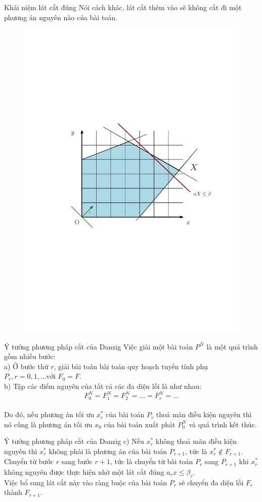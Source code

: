 \documentclass[10pt]{beamer}
\begin{document}
    \begin{frame}{Khái niệm lát cắt đúng}
         Nói cách khác, lát cắt thêm vào sẽ không cắt đi một phương án nguyên nào của bài toán.\\
    \bigskip
    \begin{figure}[h]
        \centering
        \includegraphics[width=0.6\linewidth]{anh2.pdf}
       
    \end{figure}
    \end{frame}

    \begin{frame}{ Ý tưởng phương pháp cắt của Danzig}
         Việc giải một bài toán $P^N$ là một quá trình gồm nhiều bước:\\
a) Ở bước thứ $r$,  giải bài toán bài toán quy hoạch tuyến tính phụ 
 $P_r, r = 0,1,\ldots \text{với }   F_0=F.$\\
b) Tập các điểm  nguyên của tất cả các đa diện lồi là như nhau:
$$F_0^N=F_1^N=F_2^N=\ldots=F_r^N=\ldots$$\\
Do đó, nếu phương án tối ưu $x^*_r$ của bài toán $P_r$ thoả mãn điều kiện nguyên thì nó cũng là phương án tối ưu $x_0$ của bài toán xuất phát $P^N_0$ và quá trình kết thúc.\\
\end{frame}

    \begin{frame}{ Ý tưởng phương pháp cắt của Danzig}
c)  Nếu $x^*_r$ không thoả mãn điều kiện nguyên thì $x^*_r$ không phải là 
phương án của bài toán $P_{r+1}$, tức là $x_r^*\notin F_{r+1}$.\\Chuyển từ bước $r$ sang bước $r+1$, tức là chuyển từ bài toán $P_r$ sang 
 $P_{r+1}$ khi $x^*_r$ không nguyên được thực hiện nhờ một lát cắt đúng $a_rx \le \beta_r$.\\
Việc bổ sung lát cắt này vào ràng buộc của bài toán $P_r$ sẽ chuyển đa diện lồi $F_r$ thành $F_{r+1}$.\\
    \end{frame}
\end{document}
